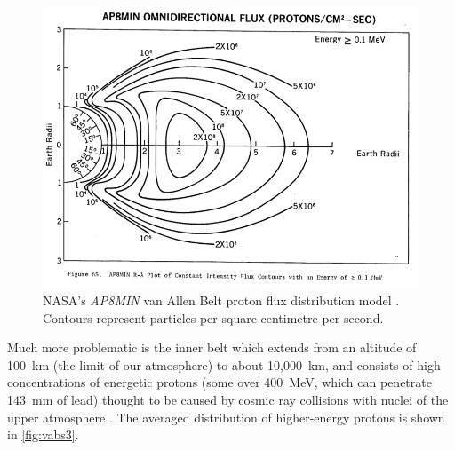 
\begin{figure} 
\includegraphics[width=\textwidth,clip,trim=0 35 0 30]{Images/800px-Ap8-omni-0_100MeV.png}
\caption{NASA's \emph{AP8MIN} van Allen Belt proton flux distribution model \parencite{Sawyer1976}. Contours represent particles per square centimetre per second.} \label{fig:vabs2}
\end{figure}

Much more problematic is the inner belt which extends from an altitude of 100~km (the limit of our atmosphere) to about 10,000~km, and consists of high concentrations of energetic protons (some over 400~MeV, which can penetrate 143~mm of lead) thought to be caused by cosmic ray collisions with nuclei of the upper atmosphere \parencite{Hess1968}. The averaged distribution of higher-energy protons is shown in \autoref{fig:vabs3}.

